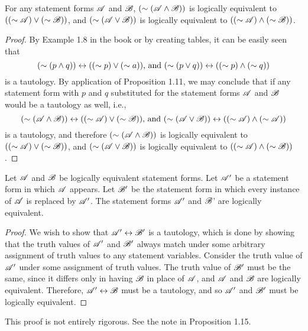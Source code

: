 \begin{proposition}
  For any statement forms \(\mathscr{A}\) and \(\mathscr{B}\), \((\sim (\mathscr{A} \land \mathscr{B}))\) is logically equivalent to \(((\sim \mathscr{A}) \lor (\sim \mathscr{B}))\), and \((\sim (\mathscr{A} \lor \mathscr{B}))\) is logically equivalent to \(((\sim \mathscr{A}) \land (\sim \mathscr{B}))\).

  \begin{proof}
    By Example 1.8 in the book or by creating tables, it can be easily seen that
    \[(\sim (p \land q)) \leftrightarrow ((\sim p) \lor (\sim a)) \text{, and } (\sim (p \lor q)) \leftrightarrow ((\sim p) \land (\sim q))\]
    is a tautology. By application of Proposition 1.11, we may conclude that if any statement form with \(p\) and \(q\) substituted for the statement forms \(\mathscr{A}\) and \(\mathscr{B}\) would be a tautology as well, i.e.,
    \[(\sim (\mathscr{A} \land \mathscr{B})) \leftrightarrow ((\sim \mathscr{A}) \lor (\sim \mathscr{B})) \text{, and } (\sim (\mathscr{A} \lor \mathscr{B})) \leftrightarrow ((\sim \mathscr{A}) \land (\sim \mathscr{A}))\]
    is a tautology, and therefore \((\sim (\mathscr{A} \land \mathscr{B}))\) is logically equivalent to \(((\sim \mathscr{A}) \lor (\sim \mathscr{B}))\), and \((\sim (\mathscr{A} \lor \mathscr{B}))\) is logically equivalent to \(((\sim \mathscr{A}) \land (\sim \mathscr{B}))\).
  \end{proof}
\end{proposition}

\setcounter{definition}{13}
\begin{proposition}
  Let \(\mathscr{A}\) and \(\mathscr{B}\) be logically equivalent statement forms. Let \(\mathscr{A}'\) be a statement form in which \(\mathscr{A}\) appears. Let \(\mathscr{B}'\) be the statement form in which every instance of \(\mathscr{A}\) is replaced by \(\mathscr{A}'\). The statement forms \(\mathscr{A}'\) and \(\mathscr{B}\)' are logically equivalent.

  \begin{proof}
    We wish to show that \(\mathscr{A}' \leftrightarrow \mathscr{B}'\) is a tautology, which is done by showing that the truth values of \(\mathscr{A}'\) and \(\mathscr{B}'\) always match under some arbitrary assignment of truth values to any statement variables. Consider the truth value of \(\mathscr{A}'\) under some assignment of truth values. The truth value of \(\mathscr{B}'\) must be the same, since it differs only in having \(\mathscr{B}\) in place of \(\mathscr{A}\), and \(\mathscr{A}\) and \(\mathscr{B}\) are logically equivalent. Therefore, \(\mathscr{A}' \leftrightarrow \mathscr{B}\) must be a tautology, and so \(\mathscr{A}'\) and \(\mathscr{B}'\) must be logically equivalent.
  \end{proof}

  \note{} This proof is not entirely rigorous. See the note in Proposition 1.15.
\end{proposition}


